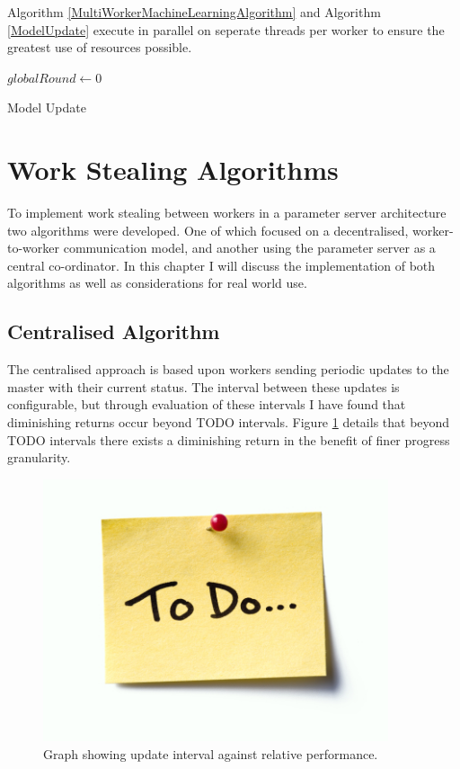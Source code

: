 \documentclass[12pt]{article}
\begin{document}
\medskip
\medskip

Algorithm \ref{MultiWorkerMachineLearningAlgorithm} and Algorithm \ref{ModelUpdate} execute in parallel on seperate threads per worker to ensure the greatest use of resources possible.
\newline

\IncMargin{1em}
\begin{algorithm}[H]
  $globalRound \longleftarrow 0$\;
 \caption{Model Update}
 \label{ModelUpdate}
\end{algorithm}
\DecMargin{1em}
\medskip

\newpage

\section{Work Stealing Algorithms}

To implement work stealing between workers in a parameter server architecture two algorithms were developed. One of which focused on a decentralised, worker-to-worker communication model, and another using the parameter server as a central co-ordinator. In this chapter I will discuss the implementation of both algorithms as well as considerations for real world use.

\subsection{Centralised Algorithm}

The centralised approach is based upon workers sending periodic updates to the master with their current status. The interval between these updates is configurable, but through evaluation of these intervals I have found that diminishing returns occur beyond TODO intervals. Figure \ref{IntervalGraph} details that beyond TODO intervals there exists a diminishing return in the benefit of finer progress granularity. 

\begin{figure}[H]
  \centering
  \includegraphics[width=4in]{todo}
  \caption[]{Graph showing update interval against relative performance.}
  \label{IntervalGraph}
\end{figure}
\end{document}
